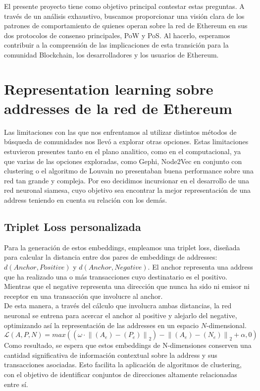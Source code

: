 \documentclass{article}
\begin{document}
El presente proyecto tiene como objetivo principal contestar estas preguntas. A través de un análisis exhaustivo, buscamos proporcionar una visión clara de los patrones de comportamiento de quienes operan sobre la red de Ethereum en sus dos protocolos de consenso principales, PoW y PoS. Al hacerlo, esperamos contribuir a la comprensión de las implicaciones de esta transición para la comunidad Blockchain, los desarrolladores y los usuarios de Ethereum.


\section{Representation learning sobre addresses de la red de Ethereum}
\label{sec:headings}
Las limitaciones con las que nos enfrentamos al utilizar distintos métodos de búsqueda de comunidades nos llevó a explorar otras opciones. Estas limitaciones estuvieron presentes tanto en el plano analitico, como en el computacional, ya que varias de las opciones exploradas, como Gephi, Node2Vec en conjunto con clustering o el algoritmo de Louvain no presentaban buena performance sobre una red tan grande y compleja. Por eso decidimos incursionar en el desarrollo de una red neuronal siamesa, cuyo objetivo sea encontrar la mejor representación de una address teniendo en cuenta su relación con los demás. 



\subsection{Triplet Loss personalizada}
Para la generación de estos embeddings, empleamos una triplet loss, diseñada para calcular la distancia entre dos pares de embeddings de addresses: $d(Anchor, Positive)$ y $d(Anchor, Negative)$. 
El anchor representa una address que ha realizado una o más transacciones cuyo destinatario es el positivo. Mientras que el negative representa una dirección que nunca ha sido ni emisor ni receptor en una transacción que involucre al anchor. \\ 
De esta manera, a través del cálculo que involucra ambas distancias, la red neuronal se entrena para acercar el anchor al positive y alejarlo del negative, optimizando así la representación de las addresses en un espacio $N$-dimensional.
\begin{equation}
	{\mathcal {L}}\left(A,P,N\right)= {max} \left((\omega \cdot {\| \left(A_{e}\right)- \left(P_{e}\right)\|}_{2})-{\| \left(A_{e}\right)- \left(N_{e}\right)\|}_{2}+\alpha ,0\right)
\end{equation}
Como resultado, se espera que estos embeddings de N-dimensiones conserven una cantidad significativa de información contextual sobre la address y sus transacciones asociadas. Esto facilita la aplicación de algoritmos de clustering, con el objetivo de identificar conjuntos de direcciones altamente relacionadas entre sí.
\end{document}
